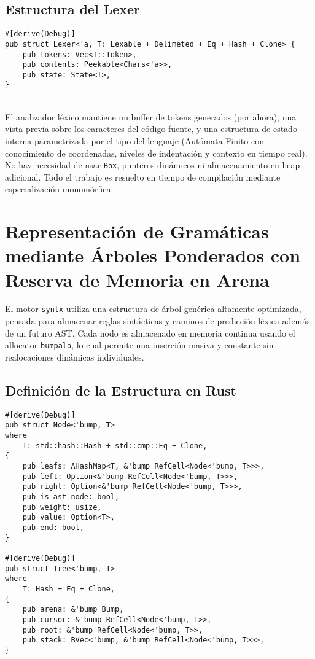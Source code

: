 \documentclass{article}
\begin{document}
\subsection*{Estructura del Lexer}

\begin{verbatim}
#[derive(Debug)]
pub struct Lexer<'a, T: Lexable + Delimeted + Eq + Hash + Clone> {
    pub tokens: Vec<T::Token>,
    pub contents: Peekable<Chars<'a>>,
    pub state: State<T>,
}
\end{verbatim}
\\
El analizador léxico mantiene un buffer de tokens generados (por ahora), una vista previa sobre los caracteres del código fuente, y una estructura de estado interna parametrizada por el tipo del lenguaje (Autómata Finito con conocimiento de coordenadas, niveles de indentación y contexto en tiempo real). No hay necesidad de usar \texttt{Box}, punteros dinámicos ni almacenamiento en heap adicional. Todo el trabajo es resuelto en tiempo de compilación mediante especialización monomórfica.

\section*{Representación de Gramáticas mediante Árboles Ponderados con Reserva de Memoria en Arena}

El motor \texttt{syntx} utiliza una estructura de árbol genérica altamente optimizada, pensada para almacenar reglas sintácticas y caminos de predicción léxica además de un futuro AST. Cada nodo es almacenado en memoria continua usando el allocator \texttt{bumpalo}, lo cual permite una inserción masiva y constante sin realocaciones dinámicas individuales.

\subsection*{Definición de la Estructura en Rust}

\begin{verbatim}
#[derive(Debug)]
pub struct Node<'bump, T>
where
    T: std::hash::Hash + std::cmp::Eq + Clone,
{
    pub leafs: AHashMap<T, &'bump RefCell<Node<'bump, T>>>,
    pub left: Option<&'bump RefCell<Node<'bump, T>>>,
    pub right: Option<&'bump RefCell<Node<'bump, T>>>,
    pub is_ast_node: bool,
    pub weight: usize,
    pub value: Option<T>,
    pub end: bool,
}

#[derive(Debug)]
pub struct Tree<'bump, T>
where
    T: Hash + Eq + Clone,
{
    pub arena: &'bump Bump,
    pub cursor: &'bump RefCell<Node<'bump, T>>,
    pub root: &'bump RefCell<Node<'bump, T>>,
    pub stack: BVec<'bump, &'bump RefCell<Node<'bump, T>>>,
}
\end{verbatim}
\end{document}
